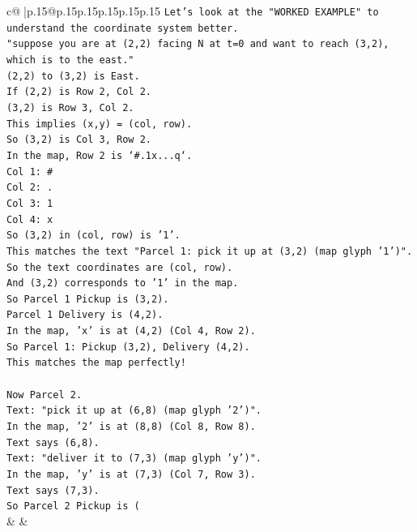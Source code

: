 \documentclass{article}
\begin{document}
{\begin{supertabular}{c@{$\;$}|p{.15\linewidth}@{}p{.15\linewidth}p{.15\linewidth}p{.15\linewidth}p{.15\linewidth}p{.15\linewidth}}
{{{\texttt{Let's look at the "WORKED EXAMPLE" to understand the coordinate system better.} \\
\texttt{"suppose you are at (2,2) facing N at t=0 and want to reach (3,2), which is to the east."} \\
\texttt{(2,2) to (3,2) is East.} \\
\texttt{If (2,2) is Row 2, Col 2.} \\
\texttt{(3,2) is Row 3, Col 2.} \\
\texttt{This implies (x,y) = (col, row).} \\
\texttt{So (3,2) is Col 3, Row 2.} \\
\texttt{In the map, Row 2 is `\#.1x...q`.} \\
\texttt{Col 1: \#} \\
\texttt{Col 2: .} \\
\texttt{Col 3: 1} \\
\texttt{Col 4: x} \\
\texttt{So (3,2) in (col, row) is '1'.} \\
\texttt{This matches the text "Parcel 1: pick it up at (3,2) (map glyph '1')".} \\
\texttt{So the text coordinates are (col, row).} \\
\texttt{And (3,2) corresponds to '1' in the map.} \\
\texttt{So Parcel 1 Pickup is (3,2).} \\
\texttt{Parcel 1 Delivery is (4,2).} \\
\texttt{In the map, 'x' is at (4,2) (Col 4, Row 2).} \\
\texttt{So Parcel 1: Pickup (3,2), Delivery (4,2).} \\
\texttt{This matches the map perfectly!} \\
\\ 
\texttt{Now Parcel 2.} \\
\texttt{Text: "pick it up at (6,8) (map glyph '2')".} \\
\texttt{In the map, '2' is at (8,8) (Col 8, Row 8).} \\
\texttt{Text says (6,8).} \\
\texttt{Text: "deliver it to (7,3) (map glyph 'y')".} \\
\texttt{In the map, 'y' is at (7,3) (Col 7, Row 3).} \\
\texttt{Text says (7,3).} \\
\texttt{So Parcel 2 Pickup is (} \\
            }
        }
    }
    & & \\ \\


\end{supertabular}}
\end{document}
